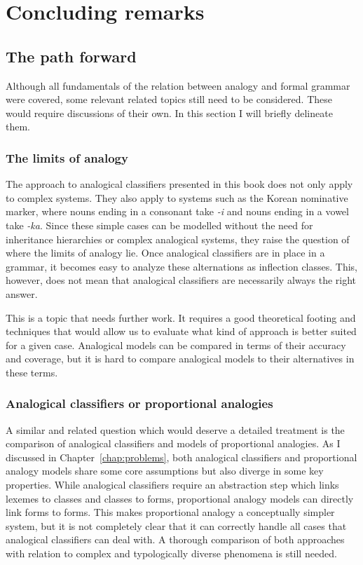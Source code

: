 \chapter{Concluding remarks}\label{chap:conclusion}

\section{The path forward}

Although all fundamentals of the relation between analogy and formal grammar were covered, some relevant related topics still need to be considered. These would require discussions of their own. In this section I will briefly delineate them.

\subsection{The limits of analogy}

The approach to analogical classifiers presented in this book does not only apply to complex systems.
They also apply to systems such as the Korean nominative marker, where nouns ending in a consonant take \textit{-i} and nouns ending in a vowel take \textit{-ka}.
Since these simple cases can be modelled without the need for inheritance hierarchies or complex analogical systems, they raise the question of where the limits of analogy lie.
Once analogical classifiers are in place in a grammar, it becomes easy to analyze these alternations as inflection classes.
This, however, does not mean that analogical classifiers are necessarily always the right answer.

This is a topic that needs further work.
It requires a good theoretical footing and techniques that would allow us to evaluate what kind of approach is better suited for a given case.
Analogical models can be compared in terms of their accuracy and coverage, but it is hard to compare analogical models to their alternatives in these terms.

\subsection{Analogical classifiers or proportional analogies}

A similar and related question which would deserve a detailed treatment is the comparison of analogical classifiers and models of proportional analogies.
As I discussed in Chapter~\ref{chap:problems}, both analogical classifiers and proportional analogy models share some core assumptions but also diverge in some key properties. While analogical classifiers require an abstraction step which links lexemes to classes and classes to forms, proportional analogy models can directly link forms to forms. This makes proportional analogy a conceptually simpler system, but it is not completely clear that it can correctly handle all cases that analogical classifiers can deal with. A thorough comparison of both approaches with relation to complex and typologically diverse phenomena is still needed.

